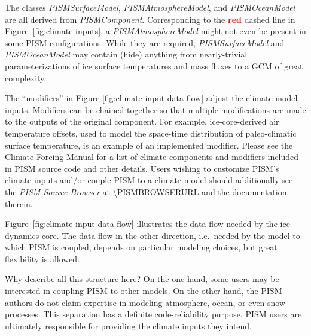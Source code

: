 The classes \mbox{\emph{PISMSurfaceModel}}, \mbox{\emph{PISMAtmosphereModel}}, and \mbox{\emph{PISMOceanModel}} are all derived from \mbox{\emph{PISMComponent}}.  Corresponding to the \textcolor{red}{\textbf{red}} dashed line in Figure~\ref{fig:climate-inputs}, a \mbox{\emph{PISMAtmosphereModel}} might not even be present in some PISM configurations.  While they are required, \emph{PISMSurfaceModel} and \emph{PISMOceanModel} may contain (hide) anything from nearly-trivial parameterizations of ice surface temperatures and mass fluxes to a GCM of great complexity.  

The ``modifiers'' in Figure \ref{fig:climate-input-data-flow} adjust the
climate model inputs.  Modifiers can be chained together so that multiple modifications
are made to the outputs of the original component.  For example,
ice-core-derived air temperature offsets, used to model the space-time
distribution of paleo-climatic surface temperature, is an example of an
implemented modifier.  Please see the Climate Forcing Manual for
a list of climate components and modifiers included in PISM source code and other details.
Users wishing to customize PISM's climate inputs and/or couple PISM to a climate
model should additionally see the \emph{PISM Source Browser} at \url{\PISMBROWSERURL}
and the documentation therein.

Figure~\ref{fig:climate-input-data-flow} illustrates the data flow needed
by the ice dynamics core.  The data flow in the other direction, i.e.~needed by the
model to which PISM is coupled, depends on particular modeling choices, but
great flexibility is allowed.

Why describe all this structure here?  On the one hand, some users may be interested
in coupling PISM to other models.  On the other hand, the PISM authors do not
claim expertise in modeling atmosphere, ocean, or even snow processes.  This
separation has a definite code-reliability purpose.  PISM users
are ultimately responsible for providing the climate inputs they intend.
